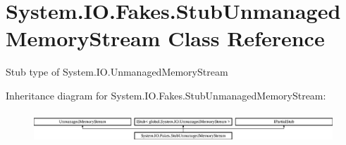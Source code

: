 \hypertarget{class_system_1_1_i_o_1_1_fakes_1_1_stub_unmanaged_memory_stream}{\section{System.\-I\-O.\-Fakes.\-Stub\-Unmanaged\-Memory\-Stream Class Reference}
\label{class_system_1_1_i_o_1_1_fakes_1_1_stub_unmanaged_memory_stream}
}


Stub type of System.\-I\-O.\-Unmanaged\-Memory\-Stream 


Inheritance diagram for System.\-I\-O.\-Fakes.\-Stub\-Unmanaged\-Memory\-Stream\-:\begin{figure}[H]
\begin{center}
\leavevmode
\includegraphics[height=1.159420cm]{class_system_1_1_i_o_1_1_fakes_1_1_stub_unmanaged_memory_stream}
\end{center}
\end{figure}
